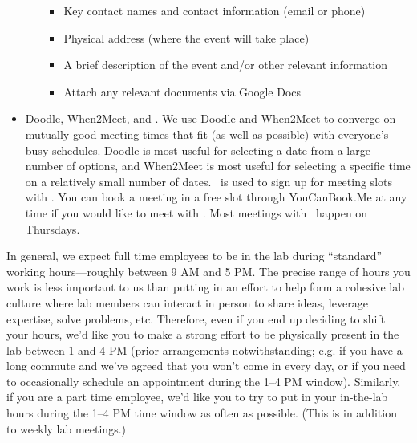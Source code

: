 \documentclass{tufte-book} %
\begin{document}
\begin{itemize}
\begin{itemize}
\begin{itemize}
\item Key contact names and contact information (email or phone)
\item Physical address (where the event will take place)
\item A brief description of the event and/or other relevant
  information
\item Attach any relevant documents via Google Docs
\end{itemize}
\end{itemize}
\item \href{http://www.doodle.com}{Doodle},
  \href{http://www.when2meet.com}{When2Meet}, and
  \meeting.  We use
  Doodle and When2Meet to converge on mutually good meeting times that
  fit (as well as possible) with everyone's busy schedules.  Doodle is
  most useful for selecting a date from a large number of options, and
  When2Meet is most useful for selecting a specific time on a
  relatively small number of dates.  \meeting~is used to sign up
  for meeting slots with \director.  You can book a meeting in a free
  slot through YouCanBook.Me at any time if you would like to meet
  with \director.  Most meetings with \director~happen on Thursdays.
\end{itemize}


 \noindent In general, we expect full time employees to be in the lab
 during ``standard'' working hours---roughly between 9 AM and 5
 PM.  The
 precise range of hours you work is less important to us than putting
 in an effort to help form a cohesive lab culture where lab members
 can interact in person to share ideas, leverage expertise, solve
 problems, etc.  Therefore, even if you end up deciding to shift your
 hours, we'd like you to make a strong effort to be physically present
 in the lab between 1 and 4 PM (prior arrangements notwithstanding;
 e.g. if you have a long commute and we've agreed that you won't come
 in every day, or if you need to occasionally schedule an appointment
 during the 1--4 PM window).  Similarly, if you are a part time
 employee, we'd like you to try to put in your in-the-lab hours during
 the 1--4 PM time window as often as possible.  (This is in addition
 to weekly lab meetings.)
\end{document}
